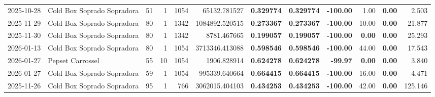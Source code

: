 {\begin{center}
{\begin{tabular}{@{}llrrrrrrrrrr@{}}
2025-10-28 & Cold Box Soprado Sopradora & 51 & 1 & 1054 & 65132.781527 & \textbf{0.329774} & \textbf{0.329774} & \textbf{-100.00} & 1.00 & \textbf{0.00} & 2.503 \\
2025-11-29 & Cold Box Soprado Sopradora & 80 & 1 & 1342 & 1084892.520515 & \textbf{0.273367} & \textbf{0.273367} & \textbf{-100.00} & 10.00 & \textbf{0.00} & 21.877 \\
2025-11-30 & Cold Box Soprado Sopradora & 80 & 1 & 1342 & 8781.467665 & \textbf{0.199057} & \textbf{0.199057} & \textbf{-100.00} & \textbf{0.00} & \textbf{0.00} & 25.293 \\
2026-01-13 & Cold Box Soprado Sopradora & 80 & 1 & 1054 & 3713346.413088 & \textbf{0.598546} & \textbf{0.598546} & \textbf{-100.00} & 44.00 & \textbf{0.00} & 17.543 \\
2026-01-27 & Pepset Carrossel & 55 & 10 & 1054 & 1906.828914 & \textbf{0.624278} & \textbf{0.624278} & \textbf{-99.97} & \textbf{0.00} & \textbf{0.00} & 3.840 \\
2026-01-27 & Cold Box Soprado Sopradora & 59 & 1 & 1054 & 995339.640664 & \textbf{0.664415} & \textbf{0.664415} & \textbf{-100.00} & 16.00 & \textbf{0.00} & 4.471 \\
2025-11-26 & Cold Box Soprado Sopradora & 95 & 1 & 766 & 3062015.404103 & \textbf{0.434253} & \textbf{0.434253} & \textbf{-100.00} & 42.00 & \textbf{0.00} & 125.146 \\
\bottomrule
\end{tabular}%
}
\end{center}
}
\vspace*{\fill}

